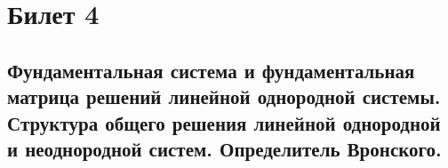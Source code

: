 


    \section*{Билет 4}
    \subsection*{Фундаментальная система и фундаментальная матрица решений линейной однородной
    системы. Структура общего решения линейной однородной и неоднородной систем.
    Определитель Вронского.}

    
